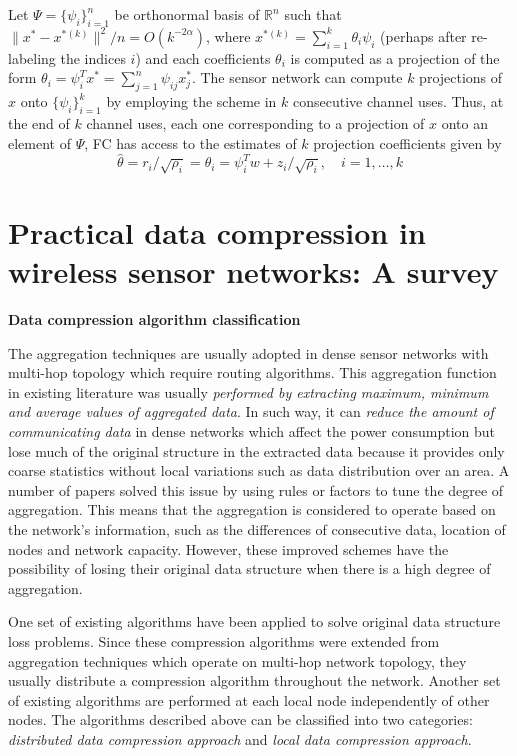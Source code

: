 Let $\Psi = \{\psi_i\}^n_{i=1}$ be orthonormal basis of $\mathbb{R}^n$ such that $\|x^*-x^{*(k)}\|^2 /n = O(k^{-2\alpha})$, where $x^{*(k)} = \sum_{i=1}^k \theta_i \psi_i$ (perhaps after re-labeling the indices $i$) and each coefficients $\theta_i$ is computed as a projection of the form $\theta_i = \psi_i^T x^* = \sum_{j=1}^n \psi_{ij}x_j^*$. The sensor network can compute $k$ projections of $x$ onto $\{\psi_i\}_{i=1}^k$ by employing the scheme in $k$ consecutive channel uses. Thus, \textcolor[rgb]{1,0,0}{at the end of $k$ channel uses, each one corresponding to a projection of $x$ onto an element of $\Psi$, FC has access to the estimates of $k$ projection coefficients given by}
\begin{equation}
    \hat{\theta} = r_i/\sqrt{\rho_i} = \theta_i = \psi_i^T w + z_i /\sqrt{\rho_i}, \quad i = 1,\dots,k
    \label{eq2.1.16}
\end{equation}

\section{Practical data compression in wireless sensor networks: A survey}

\textbf{Data compression algorithm classification}

The aggregation techniques are usually adopted in dense sensor networks with multi-hop topology which require routing algorithms. This aggregation function in existing literature was usually \emph{\textcolor[rgb]{1,0,0}{performed by extracting maximum, minimum and average values of aggregated data}}. In such way, it can \emph{\textcolor[rgb]{1,0,0}{reduce the amount of communicating data}} in dense networks which affect the power consumption but \textcolor[rgb]{0,0,1}{lose much of the original structure in the extracted data} because it \textcolor[rgb]{0,0,1}{provides only coarse statistics without local variations} such as \textcolor[rgb]{1,0,0}{data distribution over an area}\cite{1307317}. A number of papers solved this issue by using \textcolor[rgb]{1,0,0}{rules or factors to tune the degree of aggregation. This means that the aggregation is considered to operate based on the network's information, such as the differences of consecutive data, location of nodes and network capacity}. However, these improved schemes have the possibility of \textcolor[rgb]{0,0,1}{losing their original data structure} when there is a high degree of aggregation. 

One set of existing algorithms have been applied to solve original data structure loss problems. Since these compression algorithms were extended from aggregation techniques which operate on multi-hop network topology, they usually \textcolor[rgb]{1,0,0}{distribute a compression algorithm throughout the network}. Another set of existing algorithms are performed \textcolor[rgb]{1,0,0}{at each local node independently of other nodes}. The algorithms described above can be classified into two categories: \emph{\textcolor[rgb]{1,0,0}{distributed data compression approach}} and \emph{\textcolor[rgb]{1,0,0}{local data compression approach}}. 

